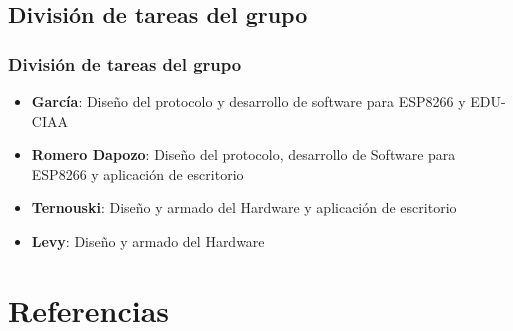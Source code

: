 \subsection{División de tareas del grupo}
\begin{frame}
	\frametitle{División de tareas del grupo}
	\begin{itemize}
		\item \textbf{García}: Diseño del protocolo y desarrollo de software para ESP8266 y EDU-CIAA
		\item \textbf{Romero Dapozo}: Diseño del protocolo, desarrollo de Software para ESP8266 y aplicación de escritorio
		\item \textbf{Ternouski}: Diseño y armado del Hardware y aplicación de escritorio
		\item \textbf{Levy}: Diseño y armado del Hardware
	\end{itemize}
\end{frame}

\section{Referencias}

